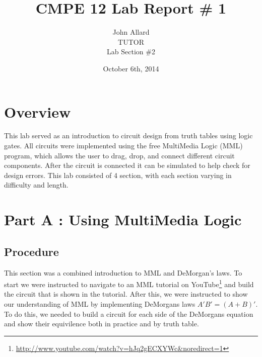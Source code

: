 \documentclass[a4paper,11pt]{article}
\title{ CMPE 12 Lab Report \# 1 \\[7 in]}
\author{John Allard \\ TUTOR \\ Lab Section \#2}
\date{October 6th, 2014}
\begin{document}
\maketitle
\newpage


\section{Overview}
This lab served as an introduction to circuit design from truth tables using logic gates. All circuits were implemented using the free MultiMedia Logic (MML) program, which allows the user to drag, drop, and connect different circuit components. After the circuit is connected it can be simulated to help check for design errors. This lab consisted of 4 section, with each section varying in difficulty and length. 




\section{Part A : Using MultiMedia Logic}
\subsection{Procedure}
This section was a combined introduction to MML and DeMorgan's laws. To start we were instructed to navigate to an MML tutorial on YouTube\footnote{\url{http://www.youtube.com/watch?v=hJq2gECXYWc&noredirect=1}} and build the circuit that is shown in the tutorial. After this, we were instructed to show our understanding of MML by implementing DeMorgans laws \(A'B' = (A+B)'\). To do this, we needed to build a circuit for each side of the DeMorgans equation and show their equivilence both in practice and by truth table. 
\end{document}
